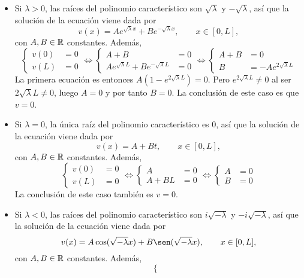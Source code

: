\documentclass[a4paper, 12pt, extrafontsizes]{memoir}
\begin{document}
\begin{itemize}
    \item Si $\lambda > 0$, las raíces del polinomio característico son $\sqrt{\lambda}$ y $-\sqrt{\lambda}$, así que la solución de la ecuación viene dada por
    \[v(x) = Ae^{\sqrt{\lambda}x}+Be^{-\sqrt{\lambda}x}, \qquad x \in [0,L],\]
    con $A,B \in \mathbb R$ constantes. Además,
    \[\left\{\begin{alignedat}{2}
        v(0) &= 0 \\
        v(L) &= 0
    \end{alignedat}\right. \iff \left\{\begin{alignedat}{2}
        A+B &= 0 \\
        Ae^{\sqrt{\lambda}L}+Be^{-\sqrt{\lambda}L} &= 0
    \end{alignedat}\right. \iff \left\{\begin{alignedat}{2}
        A+B &= 0 \\
        B &= -Ae^{2\sqrt{\lambda} L}
    \end{alignedat}\right.\]
    La primera ecuación es entonces $A(1-e^{2\sqrt{\lambda}L}) = 0$. Pero $e^{2\sqrt{\lambda}L} \neq 0$ al ser $2\sqrt{\lambda}L \neq 0$, luego $A = 0$ y por tanto $B = 0$. La conclusión de este caso es que $v = 0$.
    \item Si $\lambda = 0$, la única raíz del polinomio característico es $0$, así que la solución de la ecuación viene dada por
    \[v(x) = A+Bt, \qquad x \in [0,L],\]
    con $A,B \in \mathbb R$ constantes. Además,
    \[\left\{\begin{alignedat}{2}
        v(0) &= 0 \\
        v(L) &= 0
    \end{alignedat}\right. \iff \left\{\begin{alignedat}{2}
        A &= 0 \\
        A+BL &= 0
    \end{alignedat}\right. \iff \left\{\begin{alignedat}{2}
        A &= 0 \\
        B &= 0
    \end{alignedat}\right.\]
    La conclusión de este caso también es $v = 0$.
    \item Si $\lambda < 0$, las raíces del polinomio característico son $i\sqrt{-\lambda}$ y $-i\sqrt{-\lambda}$, así que la solución de la ecuación viene dada por
    \[v(x) = A\cos(\sqrt{-\lambda} x)+B\sen(\sqrt{-\lambda} x), \qquad x \in [0,L],\]
    con $A,B \in \mathbb R$ constantes. Además,
    \[\left\{\begin{alignedat}{2}

\end{alignedat}\]
\end{itemize}
\end{document}
